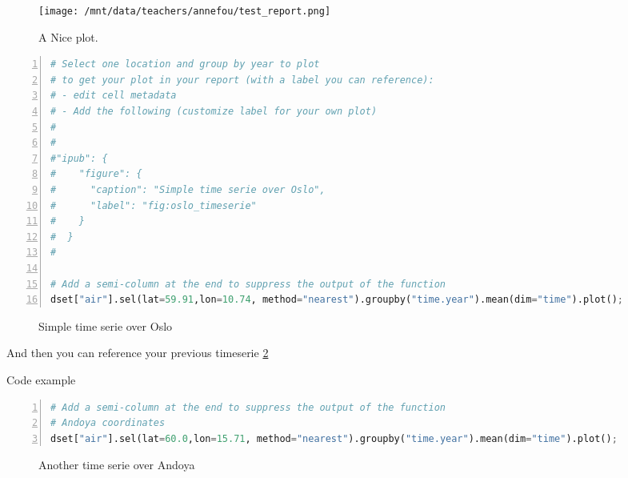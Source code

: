 \documentclass[10pt,parskip=half,
	toc=sectionentrywithdots,
	bibliography=totocnumbered,
	captions=tableheading,numbers=noendperiod]{scrartcl}
\begin{document}
\begin{figure}
  \texttt{[image: /mnt/data/teachers/annefou/test\_report.png]}
  \caption{A Nice plot.}
  \label{fig:plot_example}
\end{figure}

\begin{lstlisting}[language=Python,numbers=left,xleftmargin=20pt,xrightmargin=5pt,belowskip=5pt,aboveskip=5pt]
# Select one location and group by year to plot
# to get your plot in your report (with a label you can reference):
# - edit cell metadata
# - Add the following (customize label for your own plot)
# 
#
#"ipub": {
#    "figure": {
#      "caption": "Simple time serie over Oslo",
#      "label": "fig:oslo_timeserie"
#    }
#  }
#

# Add a semi-column at the end to suppress the output of the function
dset["air"].sel(lat=59.91,lon=10.74, method="nearest").groupby("time.year").mean(dim="time").plot();

\end{lstlisting}

\begin{figure}[H]\begin{center}\end{center}\caption{Simple time serie over Oslo}\label{fig:oslo_timeserie}
    \end{figure}

And then you can reference your previous timeserie
\ref{fig:oslo_timeserie}

\begin{codecell}[H]

    \caption{Code example}\label{code:example_code}\begin{lstlisting}[language=Python,numbers=left,xleftmargin=20pt,xrightmargin=5pt,belowskip=5pt,aboveskip=5pt]
# Add a semi-column at the end to suppress the output of the function
# Andoya coordinates
dset["air"].sel(lat=60.0,lon=15.71, method="nearest").groupby("time.year").mean(dim="time").plot();
\end{lstlisting}\end{codecell}

\begin{figure}[H]\begin{center}\end{center}\caption{Another time serie over Andoya}\label{fig:andoya_timeserie}
    \end{figure}
\end{document}
